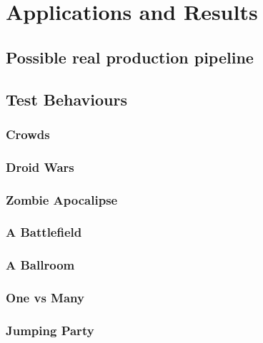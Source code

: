 \ifx\isEmbedded\undefined

\graphicspath{{../img/}}

\fi

\chapter{Applications and Results}
\label{chap:applications_results}

\section{Possible real production pipeline}

\section{Test Behaviours}

\subsection{Crowds}

\subsection{Droid Wars}

\subsection{Zombie Apocalipse}

\subsection{A Battlefield}

\subsection{A Ballroom}

\subsection{One vs Many}

\subsection{Jumping Party}


\ifx\isEmbedded\undefined


\pagebreak

\fi
